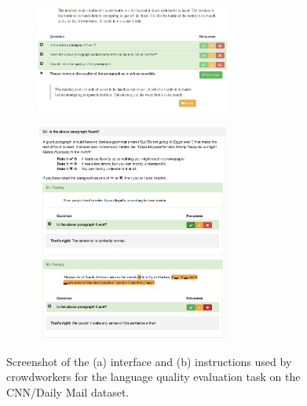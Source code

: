 \begin{figure}
  \begin{subfigure}{\textwidth}
    \centering
    \includegraphics[width=0.7\textwidth]{figures/edit}
    \caption{\label{fig:price:lqual-interface}}
  \end{subfigure}
  \begin{subfigure}{\textwidth}
    \centering
    \includegraphics[width=0.7\textwidth]{figures/lqual_tutorial}
    \caption{\label{fig:price:lqual-tutorial}}
  \end{subfigure}
  \caption{\label{fig:price:interfaces-edit} Screenshot of the (a) interface and (b) instructions used by crowdworkers for the language quality evaluation task on the CNN/Daily Mail dataset.}
\end{figure}

